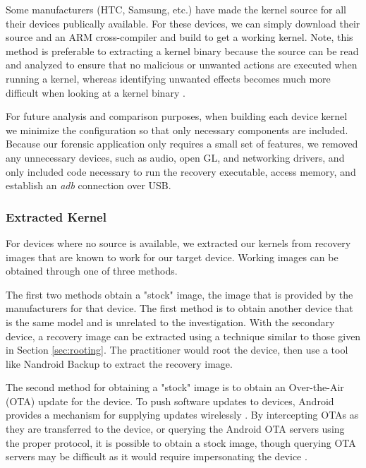 Some manufacturers (HTC, Samsung, etc.)\cite{htc_source, samsung_source} have made the kernel source for all their devices publically available.  For these devices, we can simply download their source and an ARM cross-compiler \cite{cross_compiler} and build to get a working kernel.  Note, this method is preferable to extracting a kernel binary because the source can be read and analyzed to ensure that no malicious or unwanted actions are executed when running a kernel, whereas identifying unwanted effects  becomes much more difficult when looking at a kernel binary \cite{enck_app_security}.  

For future analysis and comparison purposes, when building each device kernel we minimize the configuration so that only necessary components are included.  Because our forensic application only requires a small set of features, we removed any unnecessary devices, such as audio, open GL, and networking drivers, and only included code necessary to run the recovery executable, access memory, and establish an \emph{adb} connection over USB.

\subsubsection{Extracted Kernel}
\label{sec:extracted_kernel}

For devices where no source is available, we extracted our kernels from recovery images that are known to work for our target device.  Working images can be obtained through one of three methods.

The first two methods obtain a "stock" image, the image that is provided by the manufacturers for that device.  The first method is to obtain another device that is the same model and is unrelated to the investigation.  With the secondary device, a recovery image can be extracted using a technique similar to those given in Section \ref{sec:rooting}.  The practitioner would root the device, then use a tool like Nandroid Backup \cite{nandroid} to extract the recovery image.

The second method for obtaining a "stock" image is to obtain an Over-the-Air (OTA) update for the device.  To push software updates to devices, Android provides a mechanism for supplying updates wirelessly \cite{android_ota}.  By intercepting OTAs as they are transferred to the device, or querying the Android OTA servers using the proper protocol, it is possible to obtain a stock image, though querying OTA servers may be difficult as it would require impersonating the device \cite{tim_usenix_2012}.  

